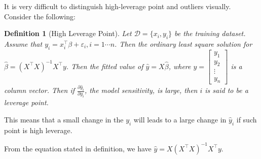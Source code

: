 \documentclass{article}
\theoremstyle{MyNonumberplain}
\theoremstyle{break}
\newcommand{\ve}{\varepsilon}
\newcommand{\T}{^\intercal}
\newcommand{\inv}{^{-1}}
\newcommand{\pd}[2]{\frac{\partial {#1}}{\partial {#2}}}
\theoremstyle{break}
\theoremstyle{break}
\theoremstyle{break}
\newtheorem{definition}{Definition}[section]
\begin{document}
It is very difficult to distinguish high-leverage point and outliers visually. Consider the following:

\begin{defbox}
    \begin{definition}[High Leverage Point]
        Let $\mathcal{D}=\bigl\{x_i,y_i\bigr\}$ be the training dataset. Assume that $y_i=x_i\T\beta+\ve_i, i=1\cdots n$.
        Then the ordinary least square solution for $\hat\beta=(X\T X)\inv X\T y$. Then the fitted value of $\hat y=X\hat\beta$, where
        $y=\begin{bmatrix}
            y_1\\
            y_2\\
            \vdots\\
            y_n
            \end{bmatrix}	
        $ is a column vector. Then if $\pd{\hat y_i}{y_i}$, the model sensitivity, is large, then $i$ is said to be a leverage point.
        
    \end{definition}
\end{defbox}

This means that a small change in the $y_i$ will leads to a large change in $\hat y_i$ if such point is high leverage. 

From the equation stated in definition, we have $\hat y=X(X\T X)\inv X\T y$.
\end{document}

